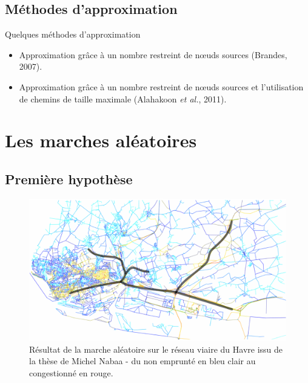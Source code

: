 \documentclass{beamer}
\begin{document}
	\subsection{Méthodes d'approximation}

\begin{frame}
	\begin{block}{Quelques méthodes d'approximation}
		\begin{itemize}
		    \item Approximation grâce à un nombre restreint de n\oe uds sources (Brandes, 2007).
		    \item Approximation grâce à un nombre restreint de n\oe uds sources et l'utilisation de chemins de taille maximale (Alahakoon \textit{et al.}, 2011).
		\end{itemize}
	\end{block}
\end{frame}

\section{Les marches aléatoires}

	\subsection{Première hypothèse}
	
\begin{frame}
	\begin{figure}[htbp]
		\centering
		\includegraphics[width=1.\linewidth]{./img/marche_aleatoire_Nabaa_LeHavre.png}
		\caption{Résultat de la marche aléatoire sur le réseau viaire du Havre issu de la thèse de Michel Nabaa - du non emprunté en bleu clair au congestionné en rouge.}
		\label{fig:algo_brandes}
	\end{figure}
\end{frame}
\end{document}
